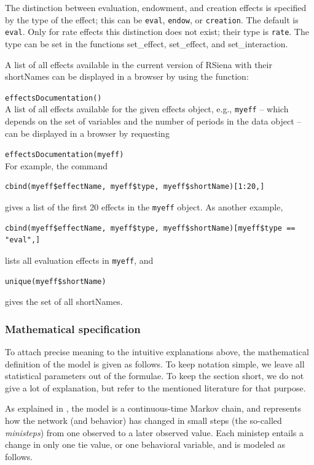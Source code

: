 \documentclass[a4paper,fleqn,11pt]{article}
\newcommand{\+}{\, + \,}
\newcommand{\sfn}[1]{\textsf{#1}}
\newcommand{\RS}{{\sf \textsf{RSiena} }}
\begin{document}
The distinction between evaluation, endowment, and creation effects is
specified by the \sfn{type} of the effect; this can be
\texttt{eval}, \texttt{endow}, or \texttt{creation}.
The default is \texttt{eval}.
Only for rate effects this distinction does not exist;
their \sfn{type} is \texttt{rate}.
The \sfn{type} can be set in the functions \sfn{set\_effect},
\textsf{set\_effect}, and \sfn{set\_interaction}.

A list of all effects available in the current version of
\RS with their \sfn{shortName}s can be displayed in a browser
by using the function:

\verb|effectsDocumentation()| \\

A list of all effects available for the given effects object, e.g.,
\texttt{myeff} -- which depends on the set of variables and the number of periods
in the data object --  can be displayed in a browser
by requesting

\verb|effectsDocumentation(myeff)| \\

For example, the command
\begin{verbatim}
cbind(myeff$effectName, myeff$type, myeff$shortName)[1:20,]
\end{verbatim}
gives a list of the first 20 effects in the \texttt{myeff} object.
As another example,
\begin{verbatim}
cbind(myeff$effectName, myeff$type, myeff$shortName)[myeff$type == "eval",]
\end{verbatim}
lists all evaluation effects in \texttt{myeff},
and
\begin{verbatim}
unique(myeff$shortName)
\end{verbatim}
gives the set of all \sfn{shortName}s.

\subsubsection{Mathematical specification}
\label{S_mathmod}

To attach precise meaning to the intuitive explanations above,
the mathematical definition of the model is given as follows.
To keep notation simple, we leave all statistical parameters out of the
formulae. To keep the section short, we do not give a lot of explanation,
but refer to the mentioned literature for that purpose.

As explained in \citet*{SnijdersEA10b}, the model is a continuous-time
Markov chain, and represents how the network (and behavior) has changed
in small steps (the so-called \emph{ministeps}) from one observed
to a later observed value. Each ministep entails a change in only
one tie value, or one behavioral variable, and is modeled as follows.
\end{document}
